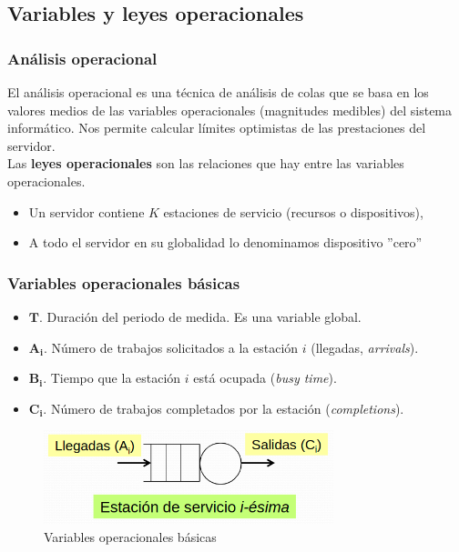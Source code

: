 \documentclass[12pt,spanish]{article}
\begin{document}
\subsection{Variables y leyes operacionales}

\subsubsection{Análisis operacional}

El análisis operacional es una técnica de análisis de colas que se basa en los valores medios de las variables operacionales (magnitudes medibles) del sistema informático. Nos permite calcular límites optimistas de las prestaciones del servidor.\\

Las \textbf{leyes operacionales} son las relaciones que hay entre las variables operacionales.

\begin{itemize}
	\item Un servidor contiene $K$ estaciones de servicio (recursos o dispositivos),
	\item A todo el servidor en su globalidad lo denominamos dispositivo ''cero''
\end{itemize}

\subsubsection{Variables operacionales básicas}

\begin{itemize}
	\item $\pmb{T}$. Duración del periodo de medida. Es una variable global.
	\item $\pmb{A_i}$. Número de trabajos solicitados a la estación $i$ (llegadas, \textit{arrivals}).
	\item $\pmb{B_i}$. Tiempo que la estación $i$ está ocupada (\textit{busy time}).
	\item $\pmb{C_i}$. Número de trabajos completados por la estación (\textit{completions}).
\end{itemize}

\begin{figure}[H]
	\centering
	\includegraphics[width=0.75\textwidth]{varbasicas.png}
	\caption{Variables operacionales básicas}
\end{figure}
\end{document}
